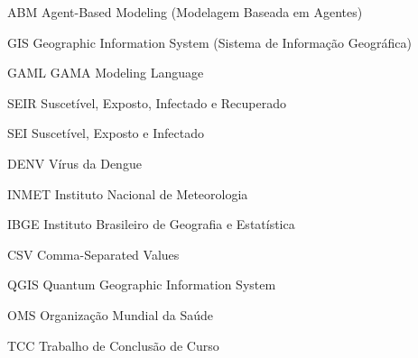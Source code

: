 \documentclass[
    12pt,
    openright,
    oneside,
    a4paper,
    english,
    brazil
]{abntex2}
\begin{document}
\begin{siglas}
    \item[ABM] Agent-Based Modeling (Modelagem Baseada em Agentes)
    \item[GIS] Geographic Information System (Sistema de Informação Geográfica)
    \item[GAML] GAMA Modeling Language
    \item[SEIR] Suscetível, Exposto, Infectado e Recuperado
    \item[SEI] Suscetível, Exposto e Infectado
    \item[DENV] Vírus da Dengue
    \item[INMET] Instituto Nacional de Meteorologia
    \item[IBGE] Instituto Brasileiro de Geografia e Estatística
    \item[CSV] Comma-Separated Values
    \item[QGIS] Quantum Geographic Information System
    \item[OMS] Organização Mundial da Saúde
    \item[TCC] Trabalho de Conclusão de Curso
\end{siglas}
\cleardoublepage


\tableofcontents\*
\cleardoublepage


\textual














\postextual

\end{document}
